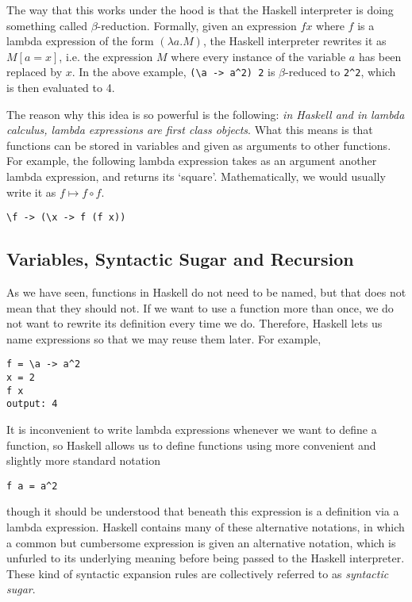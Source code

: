 \documentclass[11pt]{article}
\theoremstyle{nonumberplain}
\begin{document}
The way that this works under the hood is that the Haskell interpreter is doing something called $\beta$-reduction. Formally, given an expression $f x$ where $f$ is a lambda expression of the form $(\lambda a. M)$, the Haskell interpreter rewrites it as $M[a=x]$, i.e. the expression $M$ where every instance of the variable $a$ has been replaced by $x$. In the above example, \lstinline|(\a -> a^2) 2| is $\beta$-reduced to \lstinline|2^2|, which is then evaluated to 4.

The reason why this idea is so powerful is the following: \emph{in Haskell and in lambda calculus, lambda expressions are first class objects}. What this means is that functions can be stored in variables and given as arguments to other functions. For example, the following lambda expression takes as an argument another lambda expression, and returns its `square'. Mathematically, we would usually write it as $f \mapsto f \circ f$.
\begin{lstlisting}
\f -> (\x -> f (f x))
\end{lstlisting}

\subsection{Variables, Syntactic Sugar and Recursion}

As we have seen, functions in Haskell do not need to be named, but that does not mean that they should not. If we want to use a function more than once, we do not want to rewrite its definition every time we do. Therefore, Haskell lets us name expressions so that we may reuse them later. For example,
\begin{lstlisting}
f = \a -> a^2
x = 2
f x
output: 4
\end{lstlisting}

It is inconvenient to write lambda expressions whenever we want to define a function, so Haskell allows us to define functions using more convenient and slightly more standard notation
\begin{lstlisting}
f a = a^2
\end{lstlisting}
though it should be understood that beneath this expression is a definition via a lambda expression. Haskell contains many of these alternative notations, in which a common but cumbersome expression is given an alternative notation, which is unfurled to its underlying meaning before being passed to the Haskell interpreter. These kind of syntactic expansion rules are collectively referred to as \emph{syntactic sugar}.
\end{document}
